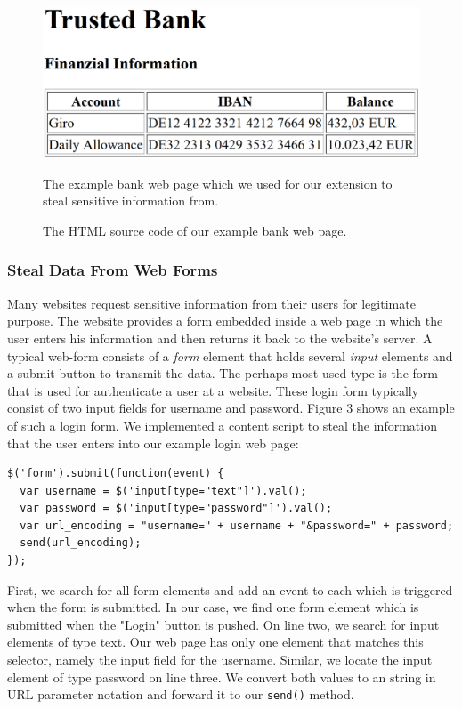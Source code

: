 \documentclass[article,colorback,accentcolor=tud9c,type=bsc]{tudthesis}
\let\stdsubsubsection\subsubsection
\renewcommand\subsubsection{\newpage\stdsubsubsection}
\begin{document}
	\begin{figure}[hb]
		\includegraphics[scale=0.3]{lib/bank.png}
		\caption[Example bank web page]{The example bank web page which we used for our extension to steal sensitive information from.}		
		
		\caption[Example bank web page as HTML]{The HTML source code of our example bank web page.}
	\end{figure}
	
\subsubsection{Steal Data From Web Forms}
	
	Many websites request sensitive information from their users for legitimate purpose. The website provides a form embedded inside a web page in which the user enters his information and then returns it back to the website's server. A typical web-form consists of a \textit{form} element that holds several \textit{input} elements and a submit button to transmit the data. The perhaps most used type is the form that is used for authenticate a user at a website. These login form typically consist of two input fields for username and password. Figure 3 shows an example of such a login form. We implemented a content script to steal the information that the user enters into our example login web page: \\
	
	\begin{lstlisting}
$('form').submit(function(event) {
  var username = $('input[type="text"]').val();
  var password = $('input[type="password"]').val();
  var url_encoding = "username=" + username + "&password=" + password;
  send(url_encoding);
});
	\end{lstlisting}
	
	First, we search for all form elements and add an event to each which is triggered when the form is submitted. In our case, we find one form element which is submitted when the "Login" button is pushed. On line two, we search for input elements of type text. Our web page has only one element that matches this selector, namely the input field for the username. Similar, we locate the input element of type password on line three. We convert both values to an string in URL parameter notation and forward it to our \texttt{send()} method. \\
	
\end{document}
